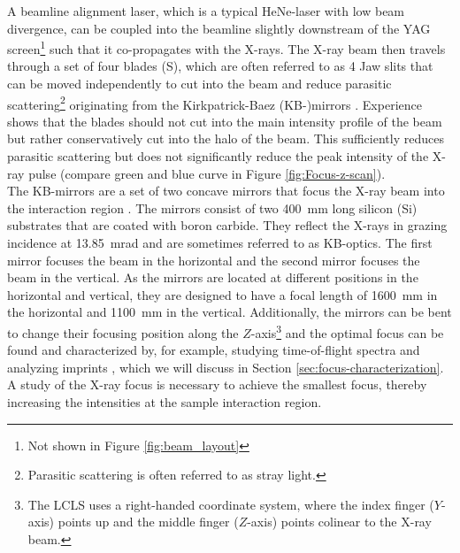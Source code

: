 A beamline alignment laser, which is a typical HeNe-laser with low beam divergence, can be coupled into the beamline slightly downstream of the YAG screen\footnote{Not shown in  Figure \ref{fig:beam_layout}} such that it co-propagates with the X-rays. 
The X-ray beam then travels through a set of four blades (S), which are often referred to as 4 Jaw slits that can be moved independently to cut into the beam and reduce parasitic scattering\footnote{Parasitic scattering is often referred to as stray light.} originating from the Kirkpatrick-Baez (KB-)mirrors \citep{Kirkpatrick-1948-JOSA}.
Experience shows that the blades should not cut into the main intensity profile of the beam but rather conservatively cut into the halo of the beam. This sufficiently reduces parasitic scattering but does not significantly reduce the peak intensity of the X-ray pulse (compare green and blue curve in Figure \ref{fig:Focus-z-scan}).\\[1\baselineskip]
%
The KB-mirrors are a set of two concave mirrors that focus the X-ray beam into the interaction region \cite{Bostedt-2013-JPB}. The mirrors consist of two \SI{400}{\milli\meter} long silicon (Si) substrates that are coated with boron carbide. They reflect the X-rays in grazing incidence at \SI{13.85}{\milli\radian} and are sometimes referred to as KB-optics. The first mirror focuses the beam in the horizontal and the second mirror focuses the beam in the vertical. As the mirrors are located at different positions in the horizontal and vertical, they are designed to have a focal length of \SI{1600}{\milli\meter} in the horizontal and \SI{1100}{\milli\meter} in the vertical. Additionally, the mirrors can be bent to change their focusing position along the $Z$-axis\footnote{The LCLS uses a right-handed coordinate system, where the index finger ($Y$-axis) points up and the middle finger ($Z$-axis) points colinear to the X-ray beam.} and the optimal focus can be found and characterized by, for example, studying time-of-flight  spectra \citep{Bucher-2016-Unpublished} and analyzing imprints \citep{Hajkova-2011-SPIE,Chalupsky-2011-NIMPR}, which we will discuss in Section \ref{sec:focus-characterization}. A study of the X-ray focus is necessary to achieve the smallest focus, thereby increasing the intensities at the sample interaction region.
